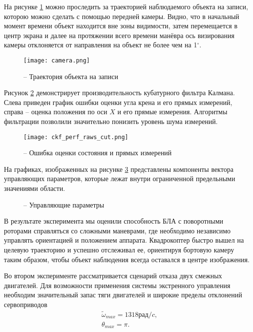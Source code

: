 На рисунке \ref{fig:mau_cam} можно проследить за траекторией наблюдаемого объекта на записи, которою можно сделать с помощью передней камеры.
Видно, что в начальный момент времени объект находится вне зоны видимости, затем перемещается в центр экрана и далее на протяжении всего времени манёвра ось визирования камеры отклоняется от направления на объект не более чем на 1$^\circ$.
\begin{figure}[H]
	\centering
	\texttt{[image: camera.png]}
	\caption{ -- Траектория объекта на записи}
	\label{fig:mau_cam}
\end{figure}
Рисунок \ref{fig:mau_est} демонстрирует производительность кубатурного фильтра Калмана. Слева приведен график ошибки оценки угла крена и его прямых измерений, справа – оценка положения по оси $X$ и его прямые измерения.
Алгоритмы фильтрации позволили значительно понизить уровень шума измерений.
\begin{figure}[H]
	\centering
	\texttt{[image: ckf\_perf\_raws\_cut.png]}
	\caption{ -- Ошибка оценки состояния и прямых измерений}
	\label{fig:mau_est}
\end{figure}

На графиках, изображенных на рисунке \ref{fig:mau_ctrl_out} представлены компоненты вектора управляющих параметров, которые лежат внутри ограниченной предельными значениями области.

\begin{figure}[H]
	\centering
	
	\caption{ -- Управляющие параметры}
	\label{fig:mau_ctrl_out}
	
\end{figure}


В результате эксперимента мы оценили способность БЛА с поворотными роторами справляться со сложными маневрами, где необходимо независимо управлять ориентацией и положением аппарата. Квадрокоптер быстро вышел на целевую траекторию и успешно отслеживал ее, ориентируя бортовую камеру таким образом, чтобы объект наблюдения всегда оставался в центре изображения.

Во втором эксперименте рассматривается сценарий отказа двух смежных двигателей. Для возможности применения системы экстренного управления необходим значительный запас тяги двигателей и широкие пределы отклонений сервоприводов
\begin{equation}
\begin{aligned}
&\tilde{\omega}_{max} = 1318 рад/c,
\\
&\theta_{max} = \pi.
\end{aligned}
\end{equation}

